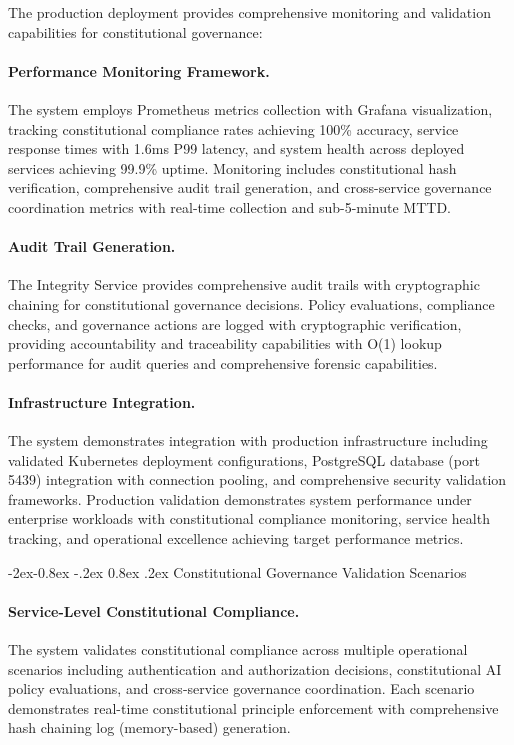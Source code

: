 \documentclass[manuscript,screen,9pt]{acmart}
\makeatletter
\renewcommand\subsubsection{\@startsection{subsubsection}{3}{\z@}%
  {-2ex\@plus -0.8ex \@minus -.2ex}%
  {0.8ex \@plus .2ex}%
  {\normalfont\normalsize\bfseries}}
\makeatother
\begin{document}
The production deployment provides comprehensive monitoring and validation capabilities for constitutional governance:

\paragraph{Performance Monitoring Framework.} The system employs Prometheus metrics collection with Grafana visualization, tracking constitutional compliance rates achieving 100\% accuracy, service response times with 1.6ms P99 latency, and system health across deployed services achieving 99.9\% uptime. Monitoring includes constitutional hash verification, comprehensive audit trail generation, and cross-service governance coordination metrics with real-time collection and sub-5-minute MTTD.

\paragraph{Audit Trail Generation.} The Integrity Service provides comprehensive audit trails with cryptographic chaining for constitutional governance decisions. Policy evaluations, compliance checks, and governance actions are logged with cryptographic verification, providing accountability and traceability capabilities with O(1) lookup performance for audit queries and comprehensive forensic capabilities.

\paragraph{Infrastructure Integration.} The system demonstrates integration with production infrastructure including validated Kubernetes deployment configurations, PostgreSQL database (port 5439) integration with connection pooling, and comprehensive security validation frameworks. Production validation demonstrates system performance under enterprise workloads with constitutional compliance monitoring, service health tracking, and operational excellence achieving target performance metrics.

\subsubsection{Constitutional Governance Validation Scenarios}
\label{subsubsec:governance_scenarios}

\paragraph{Service-Level Constitutional Compliance.} The system validates constitutional compliance across multiple operational scenarios including authentication and authorization decisions, constitutional AI policy evaluations, and cross-service governance coordination. Each scenario demonstrates real-time constitutional principle enforcement with comprehensive hash chaining log (memory-based) generation.
\end{document}
